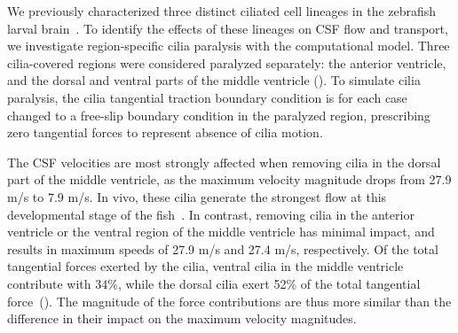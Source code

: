 \documentclass{WileyMSP-template}
\begin{document}
We previously characterized three distinct ciliated cell lineages in the
zebrafish larval brain~\cite{Olstad2019CiliaryDevelopment, DGama2025MotileBrain}.
To identify the effects of these lineages on CSF flow and transport, 
we investigate region-specific cilia paralysis with the computational model.
Three cilia-covered regions were considered paralyzed separately:
the anterior ventricle, and the dorsal and ventral parts
of the middle ventricle ().
To simulate cilia paralysis, the cilia tangential traction boundary condition
is for each case changed to a free-slip boundary condition
in the paralyzed region,
prescribing zero tangential forces to
represent absence of cilia motion.

The CSF velocities are most strongly
affected when removing cilia in the dorsal part of the middle ventricle,
as the maximum velocity magnitude drops from 27.9 \textmu m/s to 7.9 \textmu m/s.
In vivo, these cilia generate the strongest flow at
this developmental stage of the fish~\cite{Olstad2019CiliaryDevelopment}.
In contrast, removing cilia in the anterior ventricle or the ventral region of the middle
ventricle has minimal impact, and results in maximum speeds
of 27.9 \textmu m/s and 27.4 \textmu m/s, respectively.
Of the total tangential forces exerted by the cilia, ventral cilia in the middle ventricle
contribute with 34\%, while the dorsal cilia exert 52\% of the total tangential
force~(). The magnitude of the force contributions are thus
more similar than the difference in their impact on the maximum velocity magnitudes.
\end{document}
